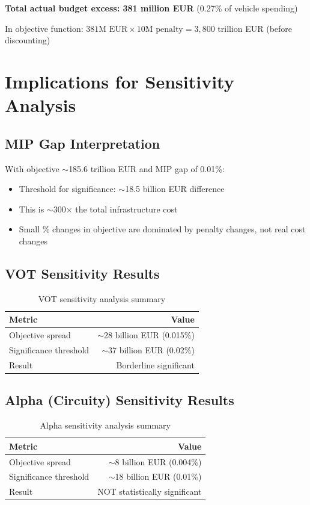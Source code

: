 \documentclass[11pt,a4paper]{article}
\begin{document}
\textbf{Total actual budget excess: 381 million EUR} (0.27\% of vehicle spending)

In objective function: $381\text{M EUR} \times 10\text{M penalty} = 3{,}800$ trillion EUR (before discounting)

\section{Implications for Sensitivity Analysis}

\subsection{MIP Gap Interpretation}

With objective $\sim$185.6 trillion EUR and MIP gap of 0.01\%:
\begin{itemize}
    \item Threshold for significance: $\sim$18.5 billion EUR difference
    \item This is $\sim$300$\times$ the total infrastructure cost
    \item Small \% changes in objective are dominated by penalty changes, not real cost changes
\end{itemize}

\subsection{VOT Sensitivity Results}

\begin{table}[h]
\centering
\begin{tabular}{lr}
\toprule
\textbf{Metric} & \textbf{Value} \\
\midrule
Objective spread & $\sim$28 billion EUR (0.015\%) \\
Significance threshold & $\sim$37 billion EUR (0.02\%) \\
Result & Borderline significant \\
\bottomrule
\end{tabular}
\caption{VOT sensitivity analysis summary}
\end{table}

\subsection{Alpha (Circuity) Sensitivity Results}

\begin{table}[h]
\centering
\begin{tabular}{lr}
\toprule
\textbf{Metric} & \textbf{Value} \\
\midrule
Objective spread & $\sim$8 billion EUR (0.004\%) \\
Significance threshold & $\sim$18 billion EUR (0.01\%) \\
Result & NOT statistically significant \\
\bottomrule
\end{tabular}
\caption{Alpha sensitivity analysis summary}
\end{table}
\end{document}
